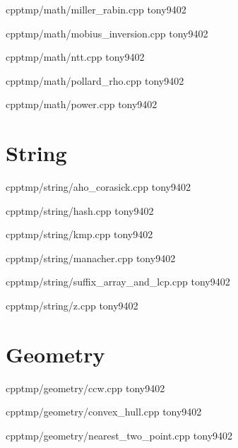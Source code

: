 {}
{}
{}
{cpp}{tmp/math/miller_rabin.cpp}
{tony9402}



{}
{}
{}
{cpp}{tmp/math/mobius_inversion.cpp}
{tony9402}



{}
{}
{}
{cpp}{tmp/math/ntt.cpp}
{tony9402}



{}
{}
{}
{cpp}{tmp/math/pollard_rho.cpp}
{tony9402}



{}
{}
{}
{cpp}{tmp/math/power.cpp}
{tony9402}


\section{String}


{}
{}
{}
{cpp}{tmp/string/aho_corasick.cpp}
{tony9402}



{}
{}
{}
{cpp}{tmp/string/hash.cpp}
{tony9402}



{}
{}
{}
{cpp}{tmp/string/kmp.cpp}
{tony9402}



{}
{}
{}
{cpp}{tmp/string/manacher.cpp}
{tony9402}



{}
{}
{}
{cpp}{tmp/string/suffix_array_and_lcp.cpp}
{tony9402}



{}
{}
{}
{cpp}{tmp/string/z.cpp}
{tony9402}


\section{Geometry}


{}
{}
{}
{cpp}{tmp/geometry/ccw.cpp}
{tony9402}



{}
{}
{}
{cpp}{tmp/geometry/convex_hull.cpp}
{tony9402}



{}
{}
{}
{cpp}{tmp/geometry/nearest_two_point.cpp}
{tony9402}
